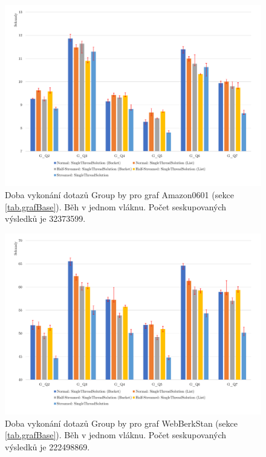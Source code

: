 \begin{figure}[!htp]
\includegraphics[width=\linewidth]{../img/amazonGroupByST.pdf}\centering
\caption{Doba vykonání dotazů Group by pro graf Amazon0601 (sekce \ref{tab.grafBase}). Běh v jednom vláknu. Počet seskupovaných výsledků je 32373599.}
\label{figure.amazonGroupByST}
\end{figure}

\begin{figure}[!htp]
\includegraphics[width=\linewidth]{../img/webberkstanGroupByST.pdf}\centering
\caption{Doba vykonání dotazů Group by pro graf WebBerkStan (sekce \ref{tab.grafBase}). Běh v jednom vláknu. Počet seskupovaných výsledků je 222498869.}
\label{figure.webberkstanGroupByST}
\end{figure}

